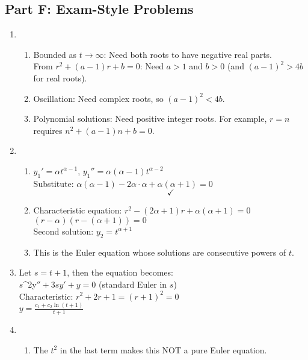 \documentclass[12pt]{article}
\begin{document}
\subsection*{Part F: Exam-Style Problems}

\begin{enumerate}[resume]
\item
\begin{enumerate}[label=(\alph*)]
\item Bounded as $t \to \infty$: Need both roots to have negative real parts.\\
From $r^{2} + (a-1)r + b = 0$: Need $a > 1$ and $b > 0$ (and $(a-1)^{2} > 4b$ for real roots).

\item Oscillation: Need complex roots, so $(a-1)^{2} < 4b$.

\item Polynomial solutions: Need positive integer roots. For example, $r = n$ requires $n^{2} + (a-1)n + b = 0$.
\end{enumerate}

\item
\begin{enumerate}[label=(\alph*)]
\item $y_{1}' = \alpha t^{\alpha-1}$, $y_{1}'' = \alpha(\alpha-1)t^{\alpha-2}$\\
Substitute: $\alpha(\alpha-1) - 2\alpha \cdot \alpha + \alpha(\alpha+1) = 0$ $$\checkmark$$

\item Characteristic equation: $r^{2} - (2\alpha+1)r + \alpha(\alpha+1) = 0$\\
$(r-\alpha)(r-(\alpha+1)) = 0$\\
Second solution: $y_{2} = t^{\alpha+1}$

\item This is the Euler equation whose solutions are consecutive powers of $t$.
\end{enumerate}

\item Let $s = t + 1$, then the equation becomes:\\
$s$^{2y}$'' + 3sy' + y = 0$ (standard Euler in $s$)\\
Characteristic: $r^{2} + 2r + 1 = (r+1)^{2} = 0$\\
$y = \frac{c_{1} + c_{2}\ln(t+1)}{t+1}$

\item
\begin{enumerate}[label=(\alph*)]
\item The $t^{2}$ in the last term makes this NOT a pure Euler equation.


\end{enumerate}
\end{enumerate}
\end{document}
